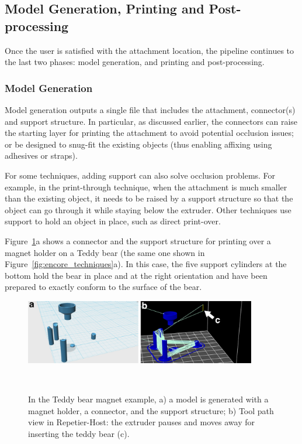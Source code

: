 \subsection{Model Generation, Printing and Post-processing}
Once the user is satisfied with the attachment location, the pipeline continues to the last two phases: model generation, and printing and post-processing.

\subsubsection{Model Generation}
Model generation outputs a single file that includes the attachment, connector(s) and support structure. In particular, as discussed earlier, the connectors can raise the starting layer for printing the attachment to avoid potential occlusion issues; or be designed to snug-fit the existing objects (thus enabling affixing using adhesives or straps).

For some techniques, adding support can also solve occlusion problems. For example, in the print-through technique, when the attachment is much smaller than the existing object, it needs to be raised by a support structure so that the object can go through it while staying below the extruder. Other techniques use support to hold an object in place, such as direct print-over.

Figure~\ref{fig:encore_support}a shows a connector and the support structure for printing over a magnet holder on a Teddy bear (the same one shown in Figure~\ref{fig:encore_techniques}a). In this case, the five support cylinders at the bottom hold the bear in place and at the right orientation and have been prepared to exactly conform to the surface of the bear.

\begin{figure}[h]
  \centering
  \includegraphics[width=0.9\textwidth]{figures/encore_support.pdf}
  \caption{In the Teddy bear magnet example, a) a model is generated with a magnet holder, a connector, and the support structure; b) Tool path view in Repetier-Host: the extruder pauses and moves away for inserting the teddy bear (c).}~\label{fig:encore_support}
\end{figure}

